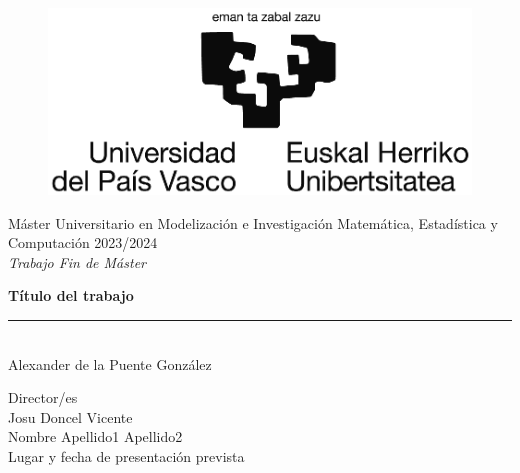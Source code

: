 \documentclass[a4paper,12pt]{report}
\begin{document}
\begin{titlepage}
\begin{sffamily}
\color{NavyBlue}
\begin{center}
\begin{figure}[htb]
\begin{center}
\vspace*{0.6cm}
\includegraphics[width=15cm]{figures/logoEHU_blanco_mediano.eps}
\vspace*{1.6cm}
\end{center}
\end{figure}
\begin{LARGE}
Máster Universitario en Modelización e Investigación Matemática, Estadística y Computación 
2023/2024 \\%
\vspace*{1cm}
\textsl{Trabajo Fin de Máster}\\
\end{LARGE}
\Huge{\textbf{Título del trabajo}} %
\vspace*{1cm}
\rule{80mm}{0.1mm}\\
\huge{Alexander de la Puente González}\\ %
\vspace*{0.5cm}
\begin{Large}
Director/es\\
Josu Doncel Vicente\\
Nombre Apellido1 Apellido2\\
Lugar y fecha de presentación prevista\\
\end{Large}
\end{center}
\end{sffamily}
\end{titlepage}

\pagestyle{fancy}
\fancyhead{} %
\setlength\headheight{21.2pt}
\end{document}
